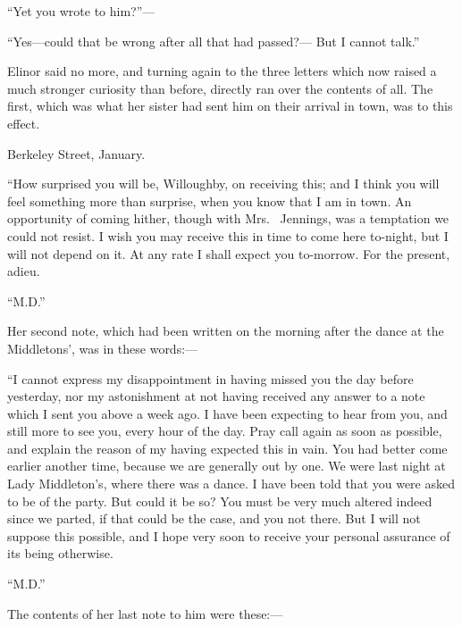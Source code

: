 \documentclass{article}
\begin{document}
``Yet you wrote to him?''---%

``Yes---could that be wrong after all that had passed?---%
But I cannot talk.''

Elinor said no more, and turning again to the three
letters which now raised a much stronger curiosity
than before, directly ran over the contents of all.
The first, which was what her sister had sent him
on their arrival in town, was to this effect.

\bigskip
                         Berkeley Street, January.
\medskip

     ``How surprised you will be, Willoughby, on
     receiving this; and I think you will feel something
     more than surprise, when you know that I am in town.
     An opportunity of coming hither, though with Mrs.\ %
     Jennings, was a temptation we could not resist.
     I wish you may receive this in time to come here
     to-night, but I will not depend on it.  At any rate
     I shall expect you to-morrow. For the present, adieu.

\medskip
                                             ``M.D.''
\bigskip

Her second note, which had been written on the morning
after the dance at the Middletons', was in these words:---%

\bigskip
     ``I cannot express my disappointment in having
     missed you the day before yesterday, nor my astonishment
     at not having received any answer to a note which
     I sent you above a week ago.  I have been expecting
     to hear from you, and still more to see you, every
     hour of the day.  Pray call again as soon as possible,
     and explain the reason of my having expected this
     in vain.  You had better come earlier another time,
     because we are generally out by one.  We were last
     night at Lady Middleton's, where there was a dance.
     I have been told that you were asked to be of the
     party.  But could it be so?  You must be very much
     altered indeed since we parted, if that could be
     the case, and you not there.  But I will not suppose
     this possible, and I hope very soon to receive your
     personal assurance of its being otherwise.

\medskip
                                            ``M.D.''
\bigskip

The contents of her last note to him were these:---%
\end{document}

